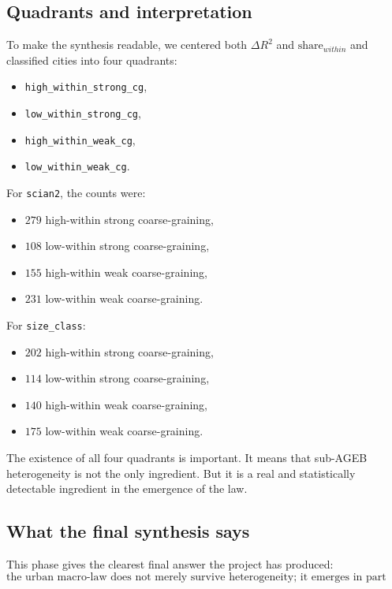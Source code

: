\documentclass[11pt]{article}
\begin{document}
\subsection{Quadrants and interpretation}

To make the synthesis readable, we centered both \(\Delta R^2\) and \(\text{share}_{within}\) and classified cities into four quadrants:
\begin{itemize}
\item \texttt{high\_within\_strong\_cg},
\item \texttt{low\_within\_strong\_cg},
\item \texttt{high\_within\_weak\_cg},
\item \texttt{low\_within\_weak\_cg}.
\end{itemize}

For \texttt{scian2}, the counts were:
\begin{itemize}
\item \(279\) high-within strong coarse-graining,
\item \(108\) low-within strong coarse-graining,
\item \(155\) high-within weak coarse-graining,
\item \(231\) low-within weak coarse-graining.
\end{itemize}

For \texttt{size\_class}:
\begin{itemize}
\item \(202\) high-within strong coarse-graining,
\item \(114\) low-within strong coarse-graining,
\item \(140\) high-within weak coarse-graining,
\item \(175\) low-within weak coarse-graining.
\end{itemize}

The existence of all four quadrants is important. It means that sub-AGEB heterogeneity is not the only ingredient. But it is a real and statistically detectable ingredient in the emergence of the law.

\subsection{What the final synthesis says}

This phase gives the clearest final answer the project has produced:
\begin{equation}
\text{the urban macro-law does not merely survive heterogeneity; it emerges in part because support aggregation absorbs it.}
\end{equation}
\end{document}
